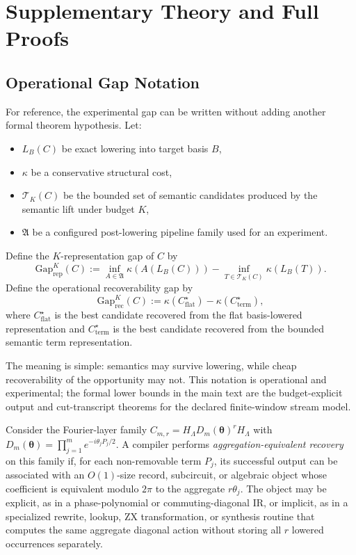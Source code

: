 \section{Supplementary Theory and Full Proofs}

\subsection{Operational Gap Notation}

For reference, the experimental gap can be written without adding another
formal theorem hypothesis. Let:
\begin{itemize}[leftmargin=1.5em]
    \item $L_B(C)$ be exact lowering into target basis $B$,
    \item $\kappa$ be a conservative structural cost,
    \item $\mathcal{T}_K(C)$ be the bounded set of semantic candidates produced
    by the semantic lift under budget $K$,
    \item $\mathfrak{A}$ be a configured post-lowering pipeline family used for
    an experiment.
\end{itemize}

Define the $K$-representation gap of $C$ by
\[
\mathrm{Gap}^{K}_{\mathrm{rep}}(C)
:=
\inf_{A \in \mathfrak{A}} \kappa(A(L_B(C)))
-
\inf_{T \in \mathcal{T}_K(C)} \kappa(L_B(T)).
\]
Define the operational recoverability gap by
\[
\mathrm{Gap}^{K}_{\mathrm{rec}}(C)
:=
\kappa(C_{\mathrm{flat}}^\star) - \kappa(C_{\mathrm{term}}^\star),
\]
where $C_{\mathrm{flat}}^\star$ is the best candidate recovered from the flat
basis-lowered representation and $C_{\mathrm{term}}^\star$ is the best
candidate recovered from the bounded semantic term representation.

The meaning is simple: semantics may survive lowering, while cheap
recoverability of the opportunity may not. This notation is operational and
experimental; the formal lower bounds in the main text are the
budget-explicit output and cut-transcript theorems for the declared
finite-window stream model.

\begin{definition}
\label{def:aggregation-equivalent-recovery}
Consider the Fourier-layer family
$C_{m,r}=H_{\Lambda}D_m(\boldsymbol{\theta})^rH_{\Lambda}$ with
$D_m(\boldsymbol{\theta})=\prod_{j=1}^m e^{-i\theta_jP_j/2}$. A compiler
performs \emph{aggregation-equivalent recovery} on this family if, for each
non-removable term $P_j$, its successful output can be associated with an
$O(1)$-size record, subcircuit, or algebraic object whose coefficient is
equivalent modulo $2\pi$ to the aggregate $r\theta_j$. The object may be
explicit, as in a phase-polynomial or commuting-diagonal IR, or implicit, as
in a specialized rewrite, lookup, ZX transformation, or synthesis routine that
computes the same aggregate diagonal action without storing all $r$ lowered
occurrences separately.
\end{definition}

